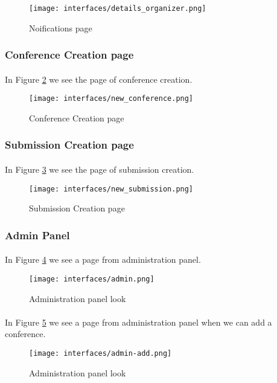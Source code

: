 		\begin{figure}[!ht]
			\centering
			\texttt{[image: interfaces/details\_organizer.png]}
			\caption{Noifications page}
			\label{fig:notifications}
		\end{figure}

	\subsubsection{Conference Creation page}
		\paragraph{}
		In Figure \ref{fig:new-conf} we see the page of conference creation.
		
		\begin{figure}[!ht]
			\centering
			\texttt{[image: interfaces/new\_conference.png]}
			\caption{Conference Creation page}
			\label{fig:new-conf}
		\end{figure}
	
	\subsubsection{Submission Creation page}
		\paragraph{}
		In Figure \ref{fig:new-sub} we see the page of submission creation.
		
		\begin{figure}[!ht]
			\centering
			\texttt{[image: interfaces/new\_submission.png]}
			\caption{Submission Creation page}
			\label{fig:new-sub}
		\end{figure}
		
	\subsubsection{Admin Panel}
		\paragraph{}
		In Figure \ref{fig:admin} we see a page from administration panel.
		
		\begin{figure}[!ht]
			\centering
			\texttt{[image: interfaces/admin.png]}
			\caption{Administration panel look}
			\label{fig:admin}
		\end{figure}
	
		\paragraph{}
		In Figure \ref{fig:admin-add} we see a page from administration panel when we can add a conference.
		
		\begin{figure}[!ht]
			\centering
			\texttt{[image: interfaces/admin-add.png]}
			\caption{Administration panel look}
			\label{fig:admin-add}
		\end{figure}